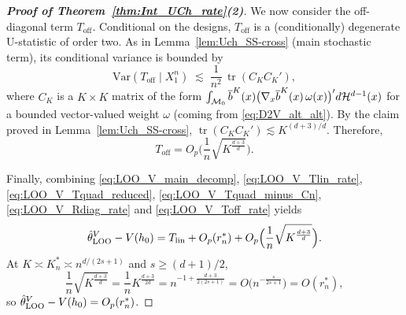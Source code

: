 \documentclass[12pt,american]{article}
\newcommand{\cH}{\mathcal{H}}
\DeclareMathOperator{\tr}{tr}
\theoremstyle{definition}
\theoremstyle{plain}
\theoremstyle{definition}
\theoremstyle{plain}
\theoremstyle{plain}
\theoremstyle{plain}
\theoremstyle{plain}
\theoremstyle{plain}
\newcommand{\Var}{\mathrm{Var}}
\begin{document}
\begin{proof}[\textbf{Proof of Theorem~\ref{thm:Int_UCh_rate}(2)}]
We now consider the off-diagonal term $T_{\mathrm{off}}$. 
Conditional on the designs, $T_{\mathrm{off}}$ is a (conditionally) degenerate U-statistic of order two.
As in Lemma~\ref{lem:Uch_SS-cross} (main stochastic term), its conditional variance is bounded by
\[
\Var(T_{\mathrm{off}}\mid X_1^n)
\;\lesssim\;\frac{1}{n^2}\,\tr(C_KC_K'),
\]
where $C_K$ is a $K\times K$ matrix of the form
$\int_{\cM_0}\ol b^K(x)\big(\nabla_x \ol b^K(x)\,\omega(x)\big)'d\cH^{d-1}(x)$ for a bounded vector-valued weight $\omega$ (coming from \eqref{eq:D2V_alt_alt}).
By the claim proved in Lemma~\ref{lem:Uch_SS-cross}, $\tr(C_KC_K')\lesssim K^{(d+3)/d}$.
Therefore,
\begin{equation}\label{eq:LOO_V_Toff_rate}
T_{\mathrm{off}}=O_p\Big(\frac1n\sqrt{K^{\frac{d+3}{d}}}\Big).
\end{equation}

Finally, combining \eqref{eq:LOO_V_main_decomp}, \eqref{eq:LOO_V_Tlin_rate}, \eqref{eq:LOO_V_Tquad_reduced}, \eqref{eq:LOO_V_Tquad_minus_Cn}, \eqref{eq:LOO_V_Rdiag_rate} and \eqref{eq:LOO_V_Toff_rate} yields
\[
\hat{\theta}_{\mathrm{LOO}}^{V}-V(h_0)
= T_{\mathrm{lin}}+O_p(r_n^*)+O_p\Big(\frac1n\sqrt{K^{\frac{d+3}{d}}}\Big).
\]
At $K\asymp K_n^*\asymp n^{d/(2s+1)}$ and $s\ge (d+1)/2$,
\[
\frac1n\sqrt{K^{\frac{d+3}{d}}}
=\frac1n K^{\frac{d+3}{2d}}
=n^{-1+\frac{d+3}{2(2s+1)}}
=O\big(n^{-\frac{s}{2s+1}}\big)=O(r_n^*),
\]
so $\hat{\theta}_{\mathrm{LOO}}^{V}-V(h_0)=O_p(r_n^*)$.
\end{proof}
\end{document}
